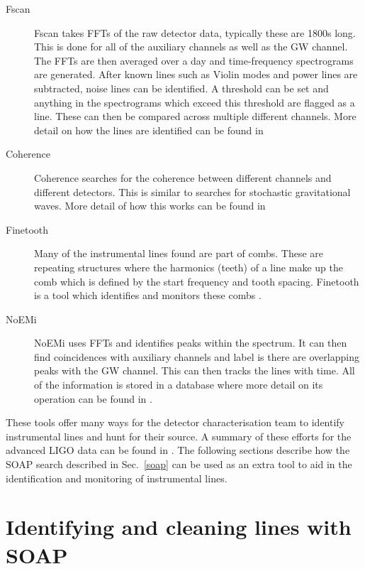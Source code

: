 \begin{description}
	\item[Fscan] Fscan \citep{coughlin2010NoiseLine} takes \glspl{FFT} of the raw detector data, typically these are 1800s long. This is done for all of the auxiliary channels as well as the \gls{GW} channel. The \glspl{FFT} are then averaged over a day and time-frequency spectrograms are generated. After known lines such as Violin modes and power lines are subtracted, noise lines can be identified. A threshold can be set and anything in the spectrograms which exceed this threshold are flagged as a line. These can then be compared across multiple different channels. More detail on how the lines are identified can be found in \citep{coughlin2010NoiseLine}
	
	\item[Coherence] Coherence searches for the coherence between different channels and different detectors. This is similar to searches for stochastic gravitational waves. More detail of how this works can be found in \citep{covas2018IdentificationMitigation}
	
	\item[Finetooth] Many of the instrumental lines found are part of combs. These are repeating structures where the harmonics (teeth) of a line make up the comb which is defined by the start frequency and tooth spacing. Finetooth is a tool which identifies and monitors these combs \citep{neunzertDailyComb}.
	
	\item[NoEMi] NoEMi uses \glspl{FFT} and identifies peaks within the spectrum. It can then find coincidences with auxiliary channels and label is there are overlapping peaks with the \gls{GW} channel. This can then tracks the lines with time. All of the information is stored in a database where more detail on its operation can be found in \citep{accadia2012NoEMiNoise}.
	
\end{description}


These tools offer many ways for the detector characterisation team to identify instrumental lines and hunt for their source. A summary of these efforts for the advanced \gls{LIGO} data can be found in \citep{covas2018IdentificationMitigation}.
The following sections describe how the SOAP search described in Sec.~\ref{soap} can be used as an extra tool to aid in the identification and monitoring of instrumental lines.

\section{\label{detchar:soap}Identifying and cleaning lines with SOAP}

